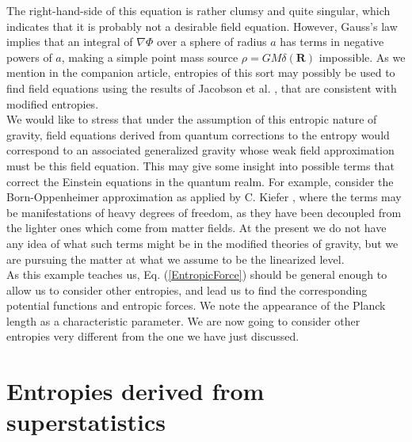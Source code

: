 \documentclass[nofootinbib,aps,prd,preprint,groupedaddress,showpacs,showkeys]{revtex4-1}
\begin{document}
\noindent The right-hand-side of this equation is rather clumsy and quite singular, which indicates that it is probably not a desirable field equation. However, Gauss's law implies that an integral of $\nabla \Phi$ over a sphere of radius $a$ has terms in negative powers of $a$, making a simple point mass source $\rho = GM \delta (\mathbf{R})$ impossible. As we mention in the companion article, entropies of this sort may possibly be used to find field equations using the results of Jacobson et al. \cite{Jacobson1, Jacobson2, Jacobson3, Jacobson4}, that are consistent with modified entropies.\\
\indent We would like to stress that under the assumption of this entropic nature of gravity, field equations derived from quantum corrections to the entropy would correspond to an associated generalized gravity whose weak field approximation must be this field equation. This may give some insight into possible terms that correct the Einstein equations in the quantum realm. For example, consider the Born-Oppenheimer approximation as applied by C. Kiefer \cite{Kiefer}, where the terms may be manifestations of heavy degrees of freedom, as they have been decoupled from the lighter ones which come from matter fields. At the present we do not have any idea of what such terms might be in the modified theories of gravity, but we are pursuing the matter at what we assume to be the linearized level.\\
\indent As this example teaches us, Eq. (\ref{EntropicForce}) should be general enough to allow us to consider other entropies, and lead us to find the corresponding potential functions and entropic forces. We note the appearance of the Planck length as a characteristic parameter. We are now going to consider other entropies very different from the one we have just discussed.

\section{Entropies derived from superstatistics}
\end{document}
